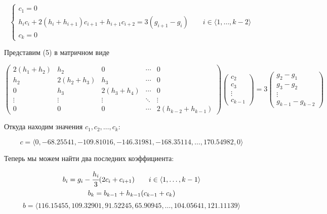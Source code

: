 \documentclass[a4paper, 14pt]{extarticle}
\begin{document}
\vspace{10pt}

\begin{equation}
    \begin{cases}
        c_1 = 0 \\
        h_i c_i + 2 (h_i + h_{i+1}) c_{i+1} + h_{i+1} c_{i+2} = 3 (g_{i+1} - g_i) \qquad i \in \langle 1, \dots, k-2 \rangle \\
        c_k = 0
    \end{cases}
\end{equation}


Представим (5) в матричном виде

\begin{equation*}
    \begin{pmatrix}
        2(h_1 + h_2) & h_2 & 0 & \cdots & 0 \\
        h_2 & 2(h_2 + h_3) & h_3 & \cdots & 0 \\
        0 & h_3 & 2(h_3 + h_4) & \cdots & 0 \\
        \vdots & \vdots & \vdots & \ddots & \vdots \\
        0 & 0 & 0 & \cdots & 2(h_{k-2} + h_{k-1})
        \end{pmatrix}
        \begin{pmatrix}
        c_2 \\
        c_3 \\
        \vdots \\
        c_{k-1}
        \end{pmatrix}
        = 3
        \begin{pmatrix}
        g_2 - g_1 \\
        g_3 - g_2 \\
        \vdots \\
        g_{k-1} - g_{k-2}
    \end{pmatrix}
\end{equation*}

Откуда находим значения $c_1, c_2, \dots, c_k$:

\begin{equation*}
    c = \langle 0, -68.25541, -109.81016, -146.31981, -168.35114, \dots, 170.54982, 0 \rangle 
\end{equation*}

Теперь мы можем найти два последних коэффициента:

\begin{gather}
    b_i = g_i - \cfrac{h_i}{3} (2 c_i + c_{i+1}) \qquad i \in \langle 1, \dots, k-1 \rangle \\
    b_k = b_{k-1} + h_{k-1} (c_{k-1} + c_k) 
\end{gather}
\begin{equation*}
    b = \langle 116.15455, 109.32901, 91.52245, 65.90945, \dots, 104.05641, 121.11139 \rangle 
\end{equation*}
\end{document}
